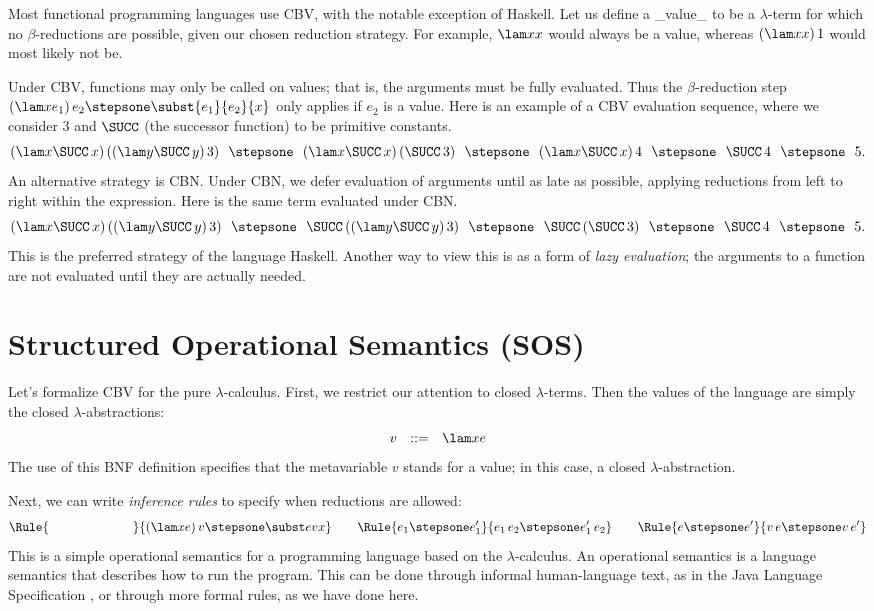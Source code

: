 Most functional programming languages use CBV, with the notable
exception of Haskell. Let us define a _value_ to be a $\lambda$-term
for which no $\beta$-reductions are possible, given our chosen
reduction strategy. For example, $\lam xx$ would always be a value,
whereas $(\lam xx)\,1$ would most likely not be.

Under CBV, functions may only be called on values; that is, the
arguments must be fully evaluated. Thus the $\beta$-reduction step
$(\lam x{e_1})\,e_2 \stepsone \subst{e_1}{e_2}{x}$ only applies if
$e_2$ is a value. Here is an example of a CBV evaluation sequence,
where we consider $3$ and $\SUCC$ (the successor function) to be
primitive constants.
\[
(\lam x{\SUCC\,x})\,((\lam y{\SUCC\,y})\,3)
\ \ \stepsone\ \ (\lam x{\SUCC\,x})\,(\SUCC\,3)
\ \ \stepsone\ \ (\lam x{\SUCC\,x})\,4
\ \ \stepsone\ \ \SUCC\,4
\ \ \stepsone\ \ 5.
\]
An alternative strategy is CBN. Under CBN, we defer evaluation of
arguments until as late as possible, applying reductions from left to
right within the expression. Here is the same term evaluated under
CBN.
\[
(\lam x{\SUCC\,x})\,((\lam y{\SUCC\,y})\,3)
\ \ \stepsone\ \ \SUCC\,((\lam y{\SUCC\,y})\,3)
\ \ \stepsone\ \ \SUCC\,(\SUCC\,3)
\ \ \stepsone\ \ \SUCC\,4
\ \ \stepsone\ \ 5.
\]
This is the preferred strategy of the language Haskell. Another way to
view this is as a form of \emph{lazy evaluation}; the arguments to a
function are not evaluated until they are actually needed.

\section{Structured Operational Semantics (SOS)}

Let's formalize CBV for the pure $\lambda$-calculus. First, we
restrict our attention to closed $\lambda$-terms.  Then the values of
the language are simply the closed $\lambda$-abstractions:
\[
v\ \ ::=\ \ \lam xe
\]
The use of this BNF definition specifies that the metavariable $v$
stands for a value; in this case, a closed $\lambda$-abstraction.

Next, we can write \emph{inference rules} to specify when reductions
are allowed:
\begin{equation}
\Rule{\phantom{e_1 \stepsone e'_1}}{(\lam xe)\,v \stepsone \subst evx}
\qquad
\Rule{e_1 \stepsone e'_1}{e_1\,e_2 \stepsone e'_1\,e_2}
\qquad
\Rule{e \stepsone e'}{ v\,e \stepsone v\,e'}
\label{eqn:cbvrules}
\end{equation}
This is a simple operational semantics for a programming language
based on the $\lambda$-calculus. An operational semantics is a
language semantics that describes how to run the program. This can be
done through informal human-language text, as in the Java Language
Specification \cite{Gosling05}, or through more formal rules, as we
have done here.

